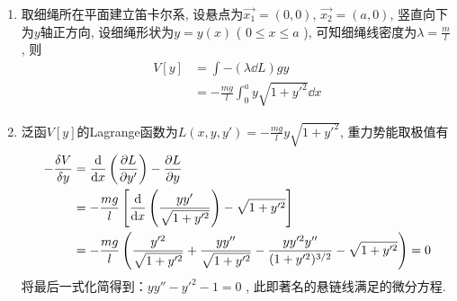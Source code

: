 \begin{solution}
    \begin{enumerate}[label=(\arabic*)]
        \item 取细绳所在平面建立笛卡尔系, 设悬点为\( \vec{x_1}=(0,0) \), \( \vec{x_2}=(a,0) \), 
        竖直向下为\(y\)轴正方向, 设细绳形状为\( y=y(x) \) ( \( 0 \leq x \leq a \) ), 可知细绳线密度为\( \lambda = \frac{m}{l} \), 则
        \[
        \begin{aligned}
            V[y] &= \int -(\lambda \dd L) gy \\
                 &= -\frac{mg}{l} \int_0^a y\sqrt{1+y'^2} \dd x
        \end{aligned}
        \]
        \item 泛函\(V[y]\)的Lagrange函数为\( L(x,y,y')=-\frac{mg}{l}y\sqrt{1+y'^2} \), 重力势能取极值有
        \[
        \begin{aligned}
            -\frac{\delta V}{\delta y} &= \frac{\dd}{\dd x} \left( \frac{\partial L}{\partial y'} \right) - \frac{\partial L}{\partial y} \\
                                 &= -\frac{mg}{l} \left[  
                                 \frac{\dd}{\dd x} \left( \frac{yy'}{\sqrt{1+y'^2}} \right) - \sqrt{1+y'^2} 
                                 \right] \\
                                 &= -\frac{mg}{l} \left( 
                                 \frac{y'^2}{\sqrt{1+y'^2}} + \frac{yy''}{\sqrt{1+y'^2}} - \frac{yy'^2y''}{ (1+y'^2)^{3/2} } - \sqrt{1+y'^2} 
                                 \right) = 0
        \end{aligned}
        \]
        将最后一式化简得到：\( yy'' - y'^2 - 1 = 0 \) , 此即著名的悬链线满足的微分方程. 
    \end{enumerate}
\end{solution}

